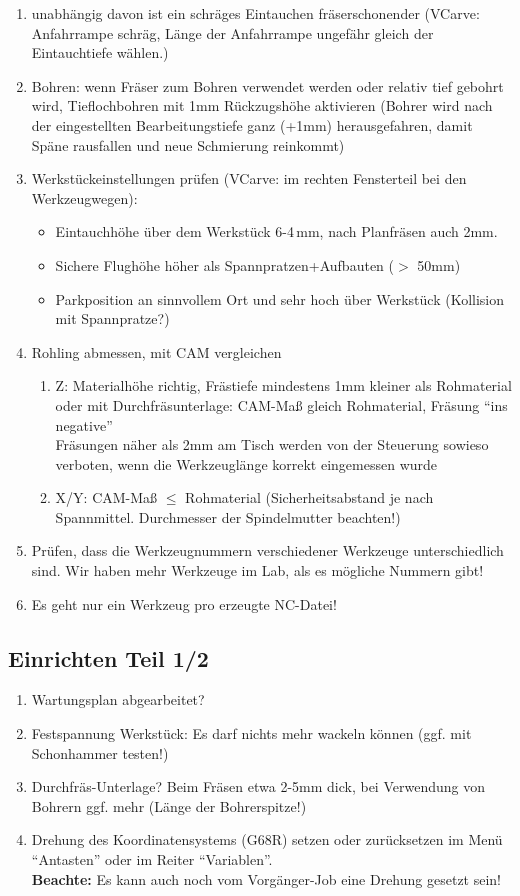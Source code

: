 \documentclass{\basedir/fablab-document}
\renewcommand{\todo}[1]{\colorbox{yellow}{{#1}}}
\begin{document}
\begin{enumerate}
	\item unabhängig davon ist ein schräges Eintauchen fräserschonender (VCarve: Anfahrrampe schräg, Länge der Anfahrrampe ungefähr gleich der Eintauchtiefe wählen.)
	\item Bohren: wenn Fräser zum Bohren verwendet werden oder relativ tief gebohrt wird, Tieflochbohren mit 1mm Rückzugshöhe aktivieren (Bohrer wird nach der eingestellten Bearbeitungstiefe ganz (+1mm) herausgefahren, damit Späne rausfallen und neue Schmierung reinkommt)
	\item Werkstückeinstellungen prüfen (VCarve: im rechten Fensterteil bei den Werkzeugwegen):
\begin{itemize}
	\item Eintauchhöhe über dem Werkstück 6-4\,mm, nach Planfräsen auch 2mm.
	\item Sichere Flughöhe höher als Spannpratzen+Aufbauten ($>$ 50mm)
	\item Parkposition an sinnvollem Ort und sehr hoch über Werkstück (Kollision mit Spannpratze?)
\end{itemize}
	\item Rohling abmessen, mit CAM vergleichen
 \begin{enumerate}
	\item Z: Materialhöhe richtig, Frästiefe mindestens 1mm kleiner als Rohmaterial \\
        oder mit Durchfräsunterlage: CAM-Maß gleich Rohmaterial, Fräsung \enquote{ins negative}\\
        Fräsungen näher als 2mm am Tisch werden von der Steuerung sowieso verboten, wenn die Werkzeuglänge korrekt eingemessen wurde
	\item X/Y: CAM-Maß $\leq$ Rohmaterial (Sicherheitsabstand je nach Spannmittel. Durchmesser der Spindelmutter beachten!)
 \end{enumerate}
	\item Prüfen, dass die Werkzeugnummern verschiedener Werkzeuge unterschiedlich sind. Wir haben mehr Werkzeuge im Lab, als es mögliche Nummern gibt!
	\item Es geht nur ein Werkzeug pro erzeugte NC-Datei!%
\end{enumerate}

\subsection{Einrichten Teil 1/2} \label{einrichten}
\begin{enumerate}
	\item Wartungsplan abgearbeitet?
	\item Festspannung Werkstück: Es darf nichts mehr wackeln können (ggf. mit Schonhammer testen!)
	\item Durchfräs-Unterlage? Beim Fräsen etwa 2-5mm dick, bei Verwendung von Bohrern ggf. mehr (Länge der Bohrerspitze!)
	\item Drehung des Koordinatensystems (G68R) setzen oder zurücksetzen im Menü \enquote{Antasten} oder im Reiter \enquote{Variablen}.\\ \textbf{Beachte:} Es kann auch noch vom Vorgänger-Job eine Drehung gesetzt sein!
\end{enumerate}
\end{document}
